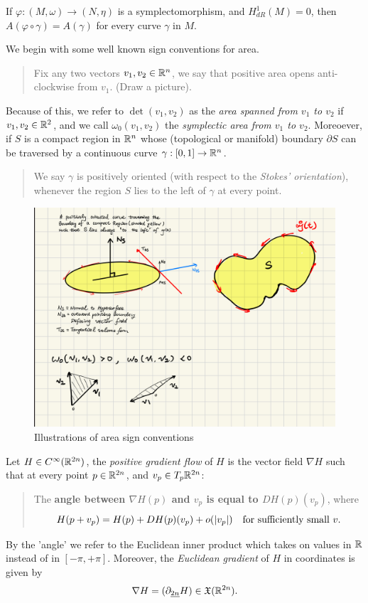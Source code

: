 \documentclass[../main-v2-manifolds.tex]{subfiles}
\begin{document}
\begin{corollary}
    If $\varphi: (M,\omega)\to (N,\eta)$ is a symplectomorphism, and $H_{dR}^{1}(M) = 0$, then $A(\varphi\circ\gamma) = A(\gamma)$ for every curve $\gamma$ in $M$.
\end{corollary}
We begin with some well known sign conventions for area.
\begin{quote}
    Fix any two vectors $v_1, v_2\in {\mathbb{R}^n}$, we say that positive area opens anti-clockwise from $v_1$. (Draw a picture).
\end{quote}
Because of this, we refer to $\det(v_1, v_2)$ as the \emph{area spanned from $v_1$ to $v_2$} if $v_1,v_2\in\mathbb{R}^2$, and we call $\omega_0(v_1,v_2)$ the \emph{symplectic area from $v_1$ to $v_2$}. Moreoever, if $S$ is a compact region in ${\mathbb{R}^n}$ whose (topological or manifold) boundary $\partial S$ can be traversed by a continuous curve $\gamma:[0,1]\to{\mathbb{R}^n}$. 
\begin{quote}
We say $\gamma$ is positively oriented (with respect to the \emph{Stokes' orientation}), whenever the region $S$ lies to the left of $\gamma$ at every point.
\end{quote}
\begin{figure}[h!]
    \centering
    \includegraphics[width=0.5\linewidth]{images/positive-area-opens-to-left-sketch.png}
    \caption{Illustrations of area sign conventions}
    \label{fig:area sign conventions}
\end{figure}
\begin{remark}\label{rmk:gradient flow}
Let $H\in C^\infty({\mathbb{R}^{2n}})$, the \emph{positive gradient flow} of $H$ is the vector field $\nabla H$ such that at every point $p\in {\mathbb{R}^{2n}}$, and $v_p\in T_p {\mathbb{R}^{2n}}$:
\begin{quote}
    The \textbf{angle between $\nabla{H}(p)$ and $v_p$ is equal to $DH(p)(v_p)$}, where
    \begin{equation}
    H(p+v_p) = H(p) + DH(p)(v_p) + o(\vert {v_p} \vert)\quad\text{for sufficiently small }v.
    \label{eq:Frechet Derivative as best possible linear approximation}
\end{equation}
\end{quote}
By the 'angle' we refer to the Euclidean inner product which takes on values in $\mathbb{R}$ instead of in $[-\pi, +\pi]$. Moreover, the \emph{Euclidean gradient} of $H$ in coordinates is given by
\[\nabla H = (\partial_{\underline{2n}}H)\in\mathfrak{X}({\mathbb{R}^{2n}}).\]
\end{remark}
\end{document}

